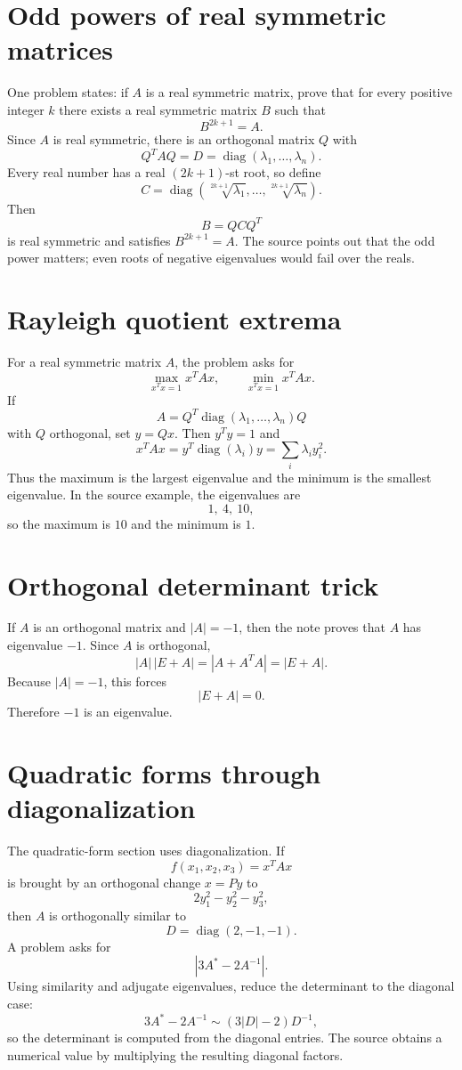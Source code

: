 \section{Odd powers of real symmetric matrices}

One problem states: if $A$ is a real symmetric matrix, prove that for every positive integer $k$ there exists a real symmetric matrix $B$ such that
\[
  B^{2k+1}=A.
\]
Since $A$ is real symmetric, there is an orthogonal matrix $Q$ with
\[
  Q^TAQ=D=\operatorname{diag}(\lambda_1,\ldots,\lambda_n).
\]
Every real number has a real $(2k+1)$-st root, so define
\[
  C=\operatorname{diag}(\sqrt[2k+1]{\lambda_1},\ldots,\sqrt[2k+1]{\lambda_n}).
\]
Then
\[
  B=QCQ^T
\]
is real symmetric and satisfies $B^{2k+1}=A$.  The source points out that the odd power matters; even roots of negative eigenvalues would fail over the reals.

\section{Rayleigh quotient extrema}

For a real symmetric matrix $A$, the problem asks for
\[
  \max_{x^Tx=1}x^TAx,\qquad
  \min_{x^Tx=1}x^TAx.
\]
If
\[
  A=Q^T\operatorname{diag}(\lambda_1,\ldots,\lambda_n)Q
\]
with $Q$ orthogonal, set $y=Qx$.  Then $y^Ty=1$ and
\[
  x^TAx=y^T\operatorname{diag}(\lambda_i)y
  =\sum_i\lambda_i y_i^2.
\]
Thus the maximum is the largest eigenvalue and the minimum is the smallest eigenvalue.  In the source example, the eigenvalues are
\[
  1,\ 4,\ 10,
\]
so the maximum is $10$ and the minimum is $1$.

\section{Orthogonal determinant trick}

If $A$ is an orthogonal matrix and $|A|=-1$, then the note proves that $A$ has eigenvalue $-1$.  Since $A$ is orthogonal,
\[
  |A|\,|E+A|=|A+A^TA|=|E+A|.
\]
Because $|A|=-1$, this forces
\[
  |E+A|=0.
\]
Therefore $-1$ is an eigenvalue.

\section{Quadratic forms through diagonalization}

The quadratic-form section uses diagonalization.  If
\[
  f(x_1,x_2,x_3)=x^TAx
\]
is brought by an orthogonal change $x=Py$ to
\[
  2y_1^2-y_2^2-y_3^2,
\]
then $A$ is orthogonally similar to
\[
  D=\operatorname{diag}(2,-1,-1).
\]
A problem asks for
\[
  |3A^*-2A^{-1}|.
\]
Using similarity and adjugate eigenvalues, reduce the determinant to the diagonal case:
\[
  3A^*-2A^{-1}
  \sim
  (3|D|-2)D^{-1},
\]
so the determinant is computed from the diagonal entries.  The source obtains a numerical value by multiplying the resulting diagonal factors.

